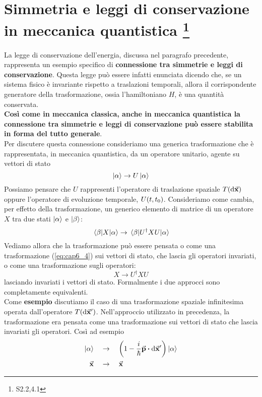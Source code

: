 \documentclass[a4paper,12pt,oneside]{book}
\begin{document}
\section[Simmetria e leggi di conservazione in meccanica quantistica]{Simmetria e leggi di conservazione in meccanica quantistica \footnote{S2.2,4.1}}
La legge di conservazione dell'energia, discussa nel paragrafo precedente, rappresenta un esempio specifico di \textbf{connessione tra simmetrie e leggi di conservazione}. Questa legge può essere infatti enunciata dicendo che, se un sistema fisico è invariante rispetto a traslazioni temporali, allora il corrispondente generatore della trasformazione, ossia l'hamiltoniano $H$, è una quantità conservata.\\
\textbf{Così come in meccanica classica, anche in meccanica quantistica la connessione tra simmetrie e leggi di conservazione può essere stabilita in forma del tutto generale}.\\
Per discutere questa connessione consideriamo una generica trasformazione che è rappresentata, in meccanica quantistica, da un operatore unitario, agente su vettori di stato
\begin{equation}
  \label{eq:cap6_4}
  \ket{\alpha}\to U\ket{\alpha}
\end{equation}
Possiamo pensare che $U$ rappresenti l'operatore di traslazione spaziale $T\qty(\dd\va{x})$ oppure l'operatore di evoluzione temporale, $U\qty(t,t_0)$.
Consideriamo come cambia, per effetto della trasformazione, un generico elemento di matrice di un operatore $X$ tra due stati $\ket{\alpha}$ e $\ket{\beta}$:
\begin{equation}
  \mel{\beta}{X}{\alpha} \to \mel{\beta}{U^{\dag}XU}{\alpha}
\end{equation}
Vediamo allora che la trasformazione può essere pensata o come una trasformazione (\ref{eq:cap6_4}) sui vettori di stato, che lascia gli operatori invariati, o come una trasformazione sugli operatori:
\begin{equation}
  \label{eq:cap6_5}
  X\to U^{\dag}XU
\end{equation}
lasciando invariati i vettori di stato. Formalmente i due approcci sono completamente equivalenti.\\
Come \textbf{esempio} discutiamo il caso di una trasformazione spaziale infinitesima operata dall'operatore $T\qty(\dd\va{x}')$.
Nell'approccio utilizzato in precedenza, la trasformazione era pensata come una trasformazione sui vettori di stato che lascia invariati gli operatori.
Così ad esempio
\begin{align}
  \ket{\alpha} \quad&\to\quad \qty(1-\frac{i}{\hbar}\va{p}\vdot\dd\va{x}')\ket{\alpha}\nonumber\\
  \va{x} \quad&\to\quad \va{x}
\end{align}
\end{document}
